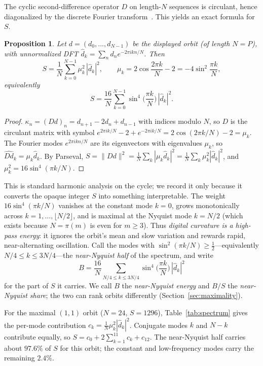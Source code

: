 \documentclass[12pt]{article}
\newtheorem{prop}{Proposition}
\theoremstyle{remark}
\begin{document}
The cyclic second-difference operator $D$ on length-$N$ sequences is circulant, hence
diagonalized by the discrete Fourier transform~\cite{Davis1979}. This yields an exact formula for $S$.

\begin{prop}\label{prop:spectral}
Let $d=(d_0,\dots,d_{N-1})$ be the displayed orbit (of length $N=P$), with unnormalized DFT
$\hat d_k=\sum_{n}d_n e^{-2\pi i kn/N}$. Then
\[
S=\frac1N\sum_{k=0}^{N-1}\mu_k^2\,|\hat d_k|^2,
\qquad
\mu_k=2\cos\!\frac{2\pi k}{N}-2=-4\sin^2\!\frac{\pi k}{N},
\]
equivalently
\[
\boxed{\;S=\frac{16}{N}\sum_{k=0}^{N-1}\sin^4\!\Big(\frac{\pi k}{N}\Big)\,|\hat d_k|^2.\;}
\]
\end{prop}

\begin{proof}
$\kappa_n=(Dd)_n=d_{n+1}-2d_n+d_{n-1}$ with indices modulo $N$, so $D$ is the circulant
matrix with symbol $e^{2\pi i k/N}-2+e^{-2\pi i k/N}=2\cos(2\pi k/N)-2=\mu_k$. The Fourier
modes $e^{2\pi i kn/N}$ are its eigenvectors with eigenvalues $\mu_k$, so
$\widehat{Dd}_k=\mu_k\hat d_k$. By Parseval, $S=\lVert Dd\rVert^2=\frac1N\sum_k|\mu_k\hat
d_k|^2=\frac1N\sum_k\mu_k^2|\hat d_k|^2$, and $\mu_k^2=16\sin^4(\pi k/N)$.
\end{proof}

This is standard harmonic analysis on the cycle; we record it only because it converts the
opaque integer $S$ into something interpretable. The weight $16\sin^4(\pi k/N)$ vanishes at
the constant mode $k=0$, grows monotonically across $k=1,\dots,\lfloor N/2\rfloor$, and is
maximal at the Nyquist mode $k=N/2$ (which exists because $N=\pi(m)$ is even for
$m\ge 3$). Thus \emph{digital curvature is a high-pass energy}: it ignores the orbit's mean
and slow variation and rewards rapid, near-alternating oscillation. Call the modes with
$\sin^2(\pi k/N)\ge\frac12$---equivalently $N/4\le k\le 3N/4$---the \emph{near-Nyquist
half} of the spectrum, and write
\[
B=\frac{16}{N}\sum_{N/4\le k\le 3N/4}\sin^4\!\Big(\frac{\pi k}{N}\Big)\,|\hat d_k|^2
\]
for the part of $S$ it carries. We call $B$ the \emph{near-Nyquist energy} and $B/S$ the
\emph{near-Nyquist share}; the two can rank orbits differently
(Section~\ref{sec:maximality}).

For the maximal $(1,1)$ orbit ($N=24$, $S=1296$), Table~\ref{tab:spectrum} gives the
per-mode contribution $c_k=\frac1N\mu_k^2|\hat d_k|^2$. Conjugate modes $k$ and $N-k$
contribute equally, so $S=c_0+2\sum_{k=1}^{11}c_k+c_{12}$. The near-Nyquist half carries
about $97.6\%$ of $S$ for this orbit; the constant and low-frequency modes carry the
remaining $2.4\%$.
\end{document}
